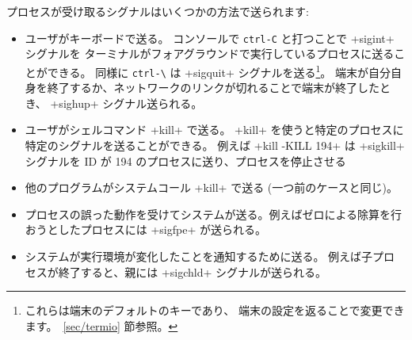 プロセスが受け取るシグナルはいくつかの方法で送られます:
%
\begin{itemize}

\item ユーザがキーボードで送る。
  コンソールで \verb'ctrl-C' と打つことで \ml+sigint+ シグナルを
  ターミナルがフォアグラウンドで実行しているプロセスに送ることができる。
  同様に \verb'ctrl-\' は \ml+sigquit+ シグナルを送る\footnote{これらは端末のデフォルトのキーであり、
    端末の設定を返ることで変更できます。~\ref {sec/termio} 節参照。}。
  端末が自分自身を終了するか、ネットワークのリンクが切れることで端末が終了したとき、 \ml+sighup+ シグナル送られる。

\item ユーザがシェルコマンド \ml+kill+ で送る。
  \ml+kill+ を使うと特定のプロセスに特定のシグナルを送ることができる。
  例えば \ml+kill -KILL 194+ は \ml+sigkill+ シグナルを ID が 194 のプロセスに送り、プロセスを停止させる

\item 他のプログラムがシステムコール \ml+kill+ で送る (一つ前のケースと同じ)。

  \item プロセスの誤った動作を受けてシステムが送る。例えばゼロによる除算を行おうとしたプロセスには
  \ml+sigfpe+ が送られる。

  \item システムが実行環境が変化したことを通知するために送る。
  例えば子プロセスが終了すると、親には \ml+sigchld+ シグナルが送られる。

\end{itemize}


